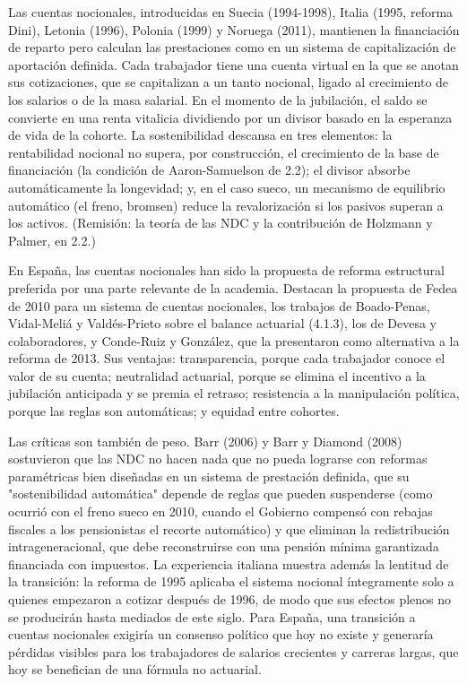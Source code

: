 \documentclass[10pt,a4paper]{article}
\begin{document}
Las cuentas nocionales, introducidas en Suecia (1994-1998), Italia (1995, reforma Dini), Letonia (1996), Polonia (1999) y Noruega (2011), mantienen la financiación de reparto pero calculan las prestaciones como en un sistema de capitalización de aportación definida. Cada trabajador tiene una cuenta virtual en la que se anotan sus cotizaciones, que se capitalizan a un tanto nocional, ligado al crecimiento de los salarios o de la masa salarial. En el momento de la jubilación, el saldo se convierte en una renta vitalicia dividiendo por un divisor basado en la esperanza de vida de la cohorte. La sostenibilidad descansa en tres elementos: la rentabilidad nocional no supera, por construcción, el crecimiento de la base de financiación (la condición de Aaron-Samuelson de 2.2); el divisor absorbe automáticamente la longevidad; y, en el caso sueco, un mecanismo de equilibrio automático (el freno, bromsen) reduce la revalorización si los pasivos superan a los activos. (Remisión: la teoría de las NDC y la contribución de Holzmann y Palmer, en 2.2.)

En España, las cuentas nocionales han sido la propuesta de reforma estructural preferida por una parte relevante de la academia. Destacan la propuesta de Fedea de 2010 para un sistema de cuentas nocionales, los trabajos de Boado-Penas, Vidal-Meliá y Valdés-Prieto sobre el balance actuarial (4.1.3), los de Devesa y colaboradores, y Conde-Ruiz y González, que la presentaron como alternativa a la reforma de 2013. Sus ventajas: transparencia, porque cada trabajador conoce el valor de su cuenta; neutralidad actuarial, porque se elimina el incentivo a la jubilación anticipada y se premia el retraso; resistencia a la manipulación política, porque las reglas son automáticas; y equidad entre cohortes.

Las críticas son también de peso. Barr (2006) y Barr y Diamond (2008) sostuvieron que las NDC no hacen nada que no pueda lograrse con reformas paramétricas bien diseñadas en un sistema de prestación definida, que su "sostenibilidad automática" depende de reglas que pueden suspenderse (como ocurrió con el freno sueco en 2010, cuando el Gobierno compensó con rebajas fiscales a los pensionistas el recorte automático) y que eliminan la redistribución intrageneracional, que debe reconstruirse con una pensión mínima garantizada financiada con impuestos. La experiencia italiana muestra además la lentitud de la transición: la reforma de 1995 aplicaba el sistema nocional íntegramente solo a quienes empezaron a cotizar después de 1996, de modo que sus efectos plenos no se producirán hasta mediados de este siglo. Para España, una transición a cuentas nocionales exigiría un consenso político que hoy no existe y generaría pérdidas visibles para los trabajadores de salarios crecientes y carreras largas, que hoy se benefician de una fórmula no actuarial.
\end{document}
